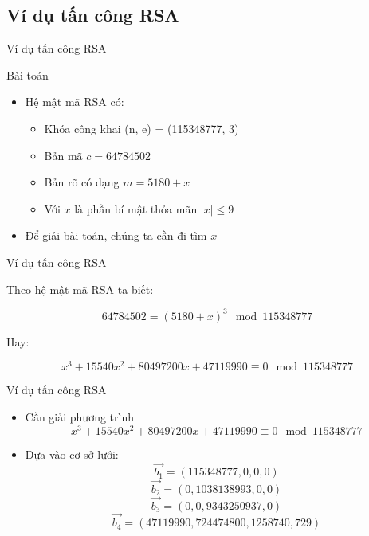 \subsection{Ví dụ tấn công RSA}

\begin{frame}{Ví dụ tấn công RSA}

\begin{block}{Bài toán}
\begin{itemize}
\item Hệ mật mã RSA có:

\begin{itemize}
\item Khóa công khai (n, e) = (115348777, 3)
\item Bản mã $c = 64784502$
\item Bản rõ có dạng $m = 5180 + x$
\item Với $x$ là phần bí mật thỏa mãn $|x| \leq 9$
\end{itemize}
\item Để giải bài toán, chúng ta cần đi tìm $x$
\end{itemize}

\end{block}
\end{frame}
\begin{frame}{Ví dụ tấn công RSA}

Theo hệ mật mã RSA ta biết:

\[
64784502 = (5180 + x)^3 \mod 115348777
\]

Hay:

\[
x^3 + 15540x^2 + 80497200x + 47119990 \equiv 0 \mod 115348777
\]

\end{frame}
\begin{frame}{Ví dụ tấn công RSA}

\begin{itemize}
\item Cần giải phương trình
\[
x^3 + 15540x^2 + 80497200x + 47119990 \equiv 0 \mod 115348777
\]
\item Dựa vào cơ sở lưới:
\[
\vec{b_1} = (115348777, 0, 0, 0)
\]
\[
\vec{b_2} = (0, 1038138993, 0, 0)
\]
\[
\vec{b_3} = (0, 0, 9343250937, 0)
\]
\[
\vec{b_4} = (47119990, 724474800, 1258740, 729)
\]
\end{itemize}

\end{frame}
